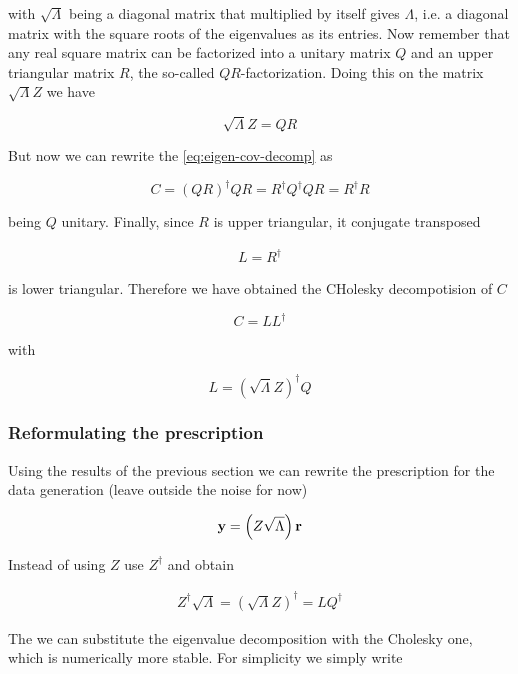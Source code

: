 with $\sqrt{\Lambda}$ being a diagonal matrix that multiplied by itself gives $\Lambda$, i.e. a diagonal matrix with the square roots of the eigenvalues as its entries. Now remember that any real square matrix can be factorized into a unitary matrix $Q$ and an upper triangular matrix $R$, the so-called $QR$-factorization. Doing this on the matrix $\sqrt{\Lambda} Z$ we have

\begin{equation}
\sqrt{\Lambda} Z = Q R
\end{equation}

But now we can rewrite the \eqref{eq:eigen-cov-decomp} as

\[
C = (QR)^{\dagger} QR = R^{\dagger} Q^{\dagger} Q R = R^{\dagger} R 
\]

being $Q$ unitary. Finally, since $R$ is upper triangular, it conjugate transposed 

\begin{align*}
L = R^{\dagger}
\end{align*}
 
is lower triangular. Therefore we have obtained the CHolesky decompotision of $C$

\begin{equation}
 C = L L^{\dagger}
\end{equation} 

with

\[
L = \left ( \sqrt{\Lambda} Z \right )^{\dagger} Q
\]

\subsubsection{Reformulating the prescription}

Using the results of the previous section we can rewrite the prescription for the data generation (leave outside the noise for now)

\begin{equation}
\mathbf{y} = \left ( Z \sqrt{\Lambda} \right ) \mathbf{r} 
\end{equation}

Instead of using $Z$ use $Z^{\dagger}$ and obtain 

\begin{align*}
Z^{\dagger} \sqrt{\Lambda} = \left ( \sqrt{\Lambda} Z\right )^{\dagger} = L Q^{\dagger}
\end{align*}

The we can substitute the eigenvalue decomposition with the Cholesky one, which is numerically more stable. For simplicity we simply write

